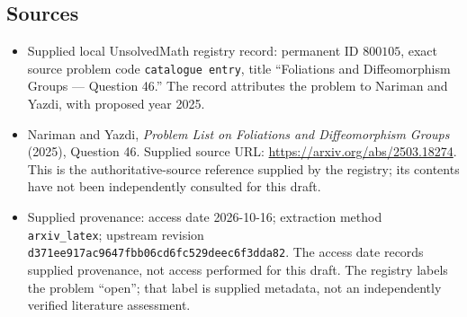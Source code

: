 \documentclass[11pt]{article}
\begin{document}
\subsection{Sources}
\begin{itemize}
\item Supplied local UnsolvedMath registry record: permanent ID \(800105\), exact source problem code \texttt{catalogue entry}, title ``Foliations and Diffeomorphism Groups --- Question 46.'' The record attributes the problem to Nariman and Yazdi, with proposed year 2025.
\item Nariman and Yazdi, \emph{Problem List on Foliations and Diffeomorphism Groups} (2025), Question 46. Supplied source URL: \url{https://arxiv.org/abs/2503.18274}. This is the authoritative-source reference supplied by the registry; its contents have not been independently consulted for this draft.
\item Supplied provenance: access date 2026-10-16; extraction method \texttt{arxiv\_latex}; upstream revision \texttt{d371ee917ac9647fbb06cd6fc529deec6f3dda82}. The access date records supplied provenance, not access performed for this draft. The registry labels the problem ``open''; that label is supplied metadata, not an independently verified literature assessment.
\end{itemize}
\end{document}
